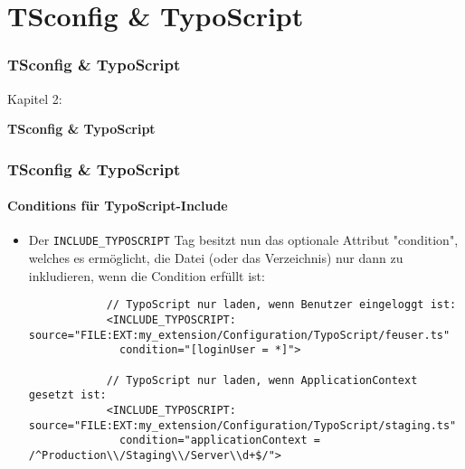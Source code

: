 %

\section{TSconfig \& TypoScript}
\begin{frame}[fragile]
	\frametitle{TSconfig \& TypoScript}

	\begin{center}\huge{Kapitel 2:}\end{center}
	\begin{center}\huge{\color{typo3darkgrey}\textbf{TSconfig \& TypoScript}}\end{center}

\end{frame}

\begin{frame}[fragile]
	\frametitle{TSconfig \& TypoScript}
	\framesubtitle{Conditions für TypoScript-Include}

	\lstset{basicstyle=\tiny\ttfamily}

	\begin{itemize}
		\item Der \texttt{INCLUDE\_TYPOSCRIPT} Tag besitzt nun das optionale Attribut "condition",
			welches es ermöglicht, die Datei (oder das Verzeichnis) nur dann zu inkludieren,
			wenn die Condition erfüllt ist:

		\begin{lstlisting}
			// TypoScript nur laden, wenn Benutzer eingeloggt ist:
			<INCLUDE_TYPOSCRIPT: source="FILE:EXT:my_extension/Configuration/TypoScript/feuser.ts"
			  condition="[loginUser = *]">

			// TypoScript nur laden, wenn ApplicationContext gesetzt ist:
			<INCLUDE_TYPOSCRIPT: source="FILE:EXT:my_extension/Configuration/TypoScript/staging.ts"
			  condition="applicationContext = /^Production\\/Staging\\/Server\\d+$/">
		\end{lstlisting}

	\end{itemize}

\end{frame}

